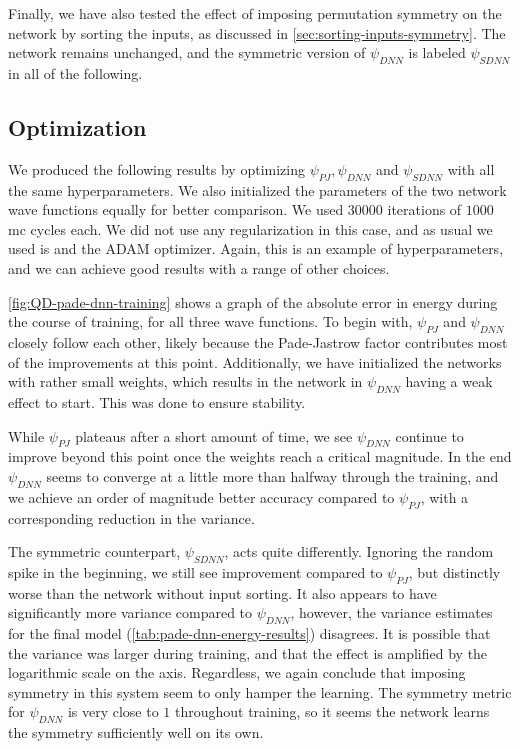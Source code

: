 \documentclass[Thesis.tex]{subfiles}
\begin{document}
Finally, we have also tested the effect of imposing permutation symmetry on the
network by sorting the inputs, as discussed in
\cref{sec:sorting-inputs-symmetry}. The network remains unchanged, and the
symmetric version of $\psi_{DNN}$ is labeled $\psi_{SDNN}$ in all of the following.


\subsection{Optimization}

We produced the following results by optimizing $\psi_{PJ}, \psi_{DNN}$ and
$\psi_{SDNN}$ with all the same hyperparameters. We also initialized the
parameters of the two network wave functions equally for better comparison.
We used $\num{30000}$ iterations of $1000$ \gls{mc} cycles each. We did not use any
regularization in this case, and as usual we used \acrlong{is} and the
ADAM optimizer. Again, this is an example of hyperparameters, and we can
achieve good results with a range of other choices.

\cref{fig:QD-pade-dnn-training} shows a graph of the absolute error in energy
during the course of training, for all three wave functions. To begin with,
$\psi_{PJ}$ and $\psi_{DNN}$ closely follow each other,
likely because the Pade-Jastrow factor contributes most of the improvements at
this point. Additionally, we have initialized the networks with rather small
weights, which results in the network in $\psi_{DNN}$ having a weak effect to
start. This was done to ensure stability.

While $\psi_{PJ}$ plateaus after a short amount of time, we see $\psi_{DNN}$
continue to improve beyond this point once the weights reach a critical
magnitude. In the end $\psi_{DNN}$ seems to converge at a little more than
halfway through the training, and we achieve an order of magnitude better
accuracy compared to $\psi_{PJ}$, with a corresponding reduction in the
variance.

The symmetric counterpart, $\psi_{SDNN}$, acts quite differently. Ignoring the
random spike in the beginning, we still see improvement compared to $\psi_{PJ}$,
but distinctly worse than the network without input sorting. It also appears to
have significantly more variance compared to $\psi_{DNN}$, however, the variance
estimates for the final model (\cref{tab:pade-dnn-energy-results}) disagrees. It
is possible that the variance was larger during training, and that the effect is
amplified by the logarithmic scale on the axis. Regardless, we again
conclude that imposing symmetry in this system seem to only hamper the learning.
The symmetry metric for $\psi_{DNN}$ is very close to $1$ throughout training,
so it seems the network learns the symmetry sufficiently well on its own.
\end{document}
